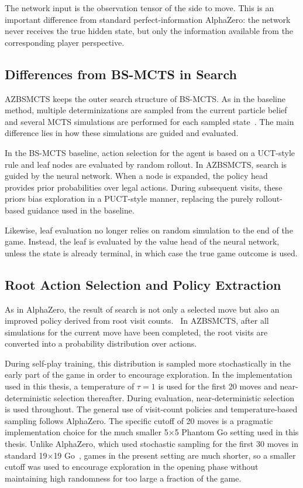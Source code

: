 \documentclass[12pt,oneside,openright]{article}
\begin{document}
The network input is the observation tensor of the side to move. This is an important
difference from standard perfect-information AlphaZero: the network never receives
the true hidden state, but only the information available from the corresponding player
perspective.

\subsection{Differences from BS-MCTS in Search}

AZBSMCTS keeps the outer search structure of BS-MCTS. As in the baseline method,
multiple determinizations are sampled from the current particle belief and several MCTS
simulations are performed for each sampled state~\cite{Wang2015bsmcts}. The main
difference lies in how these simulations are guided and evaluated.

In the BS-MCTS baseline, action selection for the agent is based on a UCT-style rule
and leaf nodes are evaluated by random rollout. In AZBSMCTS, search is guided by
the neural network. When a node
is expanded, the policy head provides prior probabilities over legal actions. During
subsequent visits, these priors bias exploration in a PUCT-style manner, replacing the
purely rollout-based guidance used in the baseline.

Likewise, leaf evaluation no longer relies on random simulation to the end of the game.
Instead, the leaf is evaluated by the value head of the neural network, unless the state
is already terminal, in which case the true game outcome is used.

\subsection{Root Action Selection and Policy Extraction}

As in AlphaZero, the result of search is not only a selected move but also an improved
policy derived from root visit counts.~\cite{Silver2017alphazero} In AZBSMCTS,
after all simulations for the current move have been completed, the root visits are
converted into a probability distribution over actions.

During self-play training, this distribution is sampled more stochastically in the early
part of the game in order to encourage exploration. In the implementation used in this
thesis, a temperature of $\tau=1$ is used for the first 20 moves and near-deterministic
selection thereafter. During evaluation, near-deterministic selection is used throughout.
The general use of visit-count policies and temperature-based sampling follows
AlphaZero. The specific cutoff of 20 moves is a
pragmatic implementation choice for the much smaller 5$\times$5 Phantom Go setting
used in this thesis. Unlike AlphaZero, which used stochastic sampling for the
first 30 moves in standard 19$\times$19 Go~\cite{Silver2017alphazero}, games in the present setting are much
shorter, so a smaller cutoff was used to encourage exploration in the opening phase
without maintaining high randomness for too large a fraction of the game.
\end{document}
